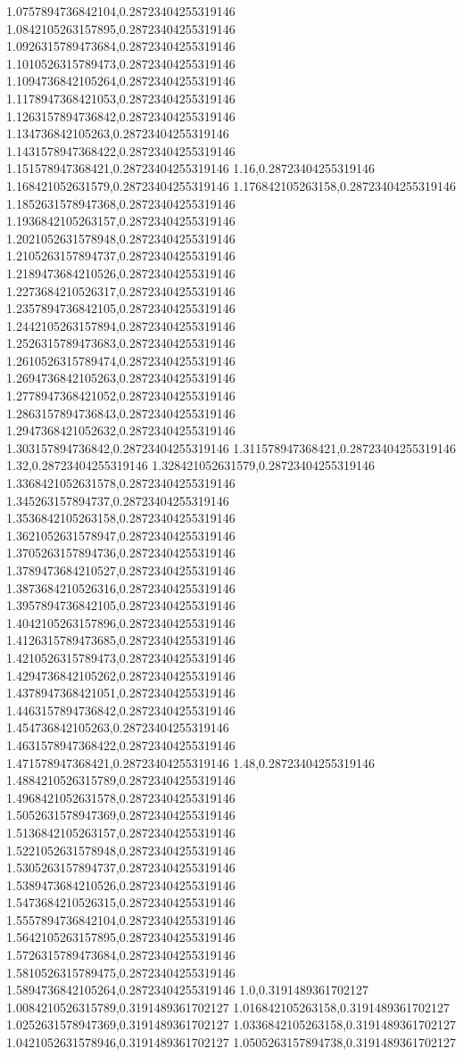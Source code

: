 1.0757894736842104,0.28723404255319146
1.0842105263157895,0.28723404255319146
1.0926315789473684,0.28723404255319146
1.1010526315789473,0.28723404255319146
1.1094736842105264,0.28723404255319146
1.1178947368421053,0.28723404255319146
1.1263157894736842,0.28723404255319146
1.134736842105263,0.28723404255319146
1.1431578947368422,0.28723404255319146
1.151578947368421,0.28723404255319146
1.16,0.28723404255319146
1.168421052631579,0.28723404255319146
1.176842105263158,0.28723404255319146
1.1852631578947368,0.28723404255319146
1.1936842105263157,0.28723404255319146
1.2021052631578948,0.28723404255319146
1.2105263157894737,0.28723404255319146
1.2189473684210526,0.28723404255319146
1.2273684210526317,0.28723404255319146
1.2357894736842105,0.28723404255319146
1.2442105263157894,0.28723404255319146
1.2526315789473683,0.28723404255319146
1.2610526315789474,0.28723404255319146
1.2694736842105263,0.28723404255319146
1.2778947368421052,0.28723404255319146
1.2863157894736843,0.28723404255319146
1.2947368421052632,0.28723404255319146
1.303157894736842,0.28723404255319146
1.311578947368421,0.28723404255319146
1.32,0.28723404255319146
1.328421052631579,0.28723404255319146
1.3368421052631578,0.28723404255319146
1.345263157894737,0.28723404255319146
1.3536842105263158,0.28723404255319146
1.3621052631578947,0.28723404255319146
1.3705263157894736,0.28723404255319146
1.3789473684210527,0.28723404255319146
1.3873684210526316,0.28723404255319146
1.3957894736842105,0.28723404255319146
1.4042105263157896,0.28723404255319146
1.4126315789473685,0.28723404255319146
1.4210526315789473,0.28723404255319146
1.4294736842105262,0.28723404255319146
1.4378947368421051,0.28723404255319146
1.4463157894736842,0.28723404255319146
1.454736842105263,0.28723404255319146
1.4631578947368422,0.28723404255319146
1.471578947368421,0.28723404255319146
1.48,0.28723404255319146
1.4884210526315789,0.28723404255319146
1.4968421052631578,0.28723404255319146
1.5052631578947369,0.28723404255319146
1.5136842105263157,0.28723404255319146
1.5221052631578948,0.28723404255319146
1.5305263157894737,0.28723404255319146
1.5389473684210526,0.28723404255319146
1.5473684210526315,0.28723404255319146
1.5557894736842104,0.28723404255319146
1.5642105263157895,0.28723404255319146
1.5726315789473684,0.28723404255319146
1.5810526315789475,0.28723404255319146
1.5894736842105264,0.28723404255319146
1.0,0.3191489361702127
1.0084210526315789,0.3191489361702127
1.016842105263158,0.3191489361702127
1.0252631578947369,0.3191489361702127
1.0336842105263158,0.3191489361702127
1.0421052631578946,0.3191489361702127
1.0505263157894738,0.3191489361702127
